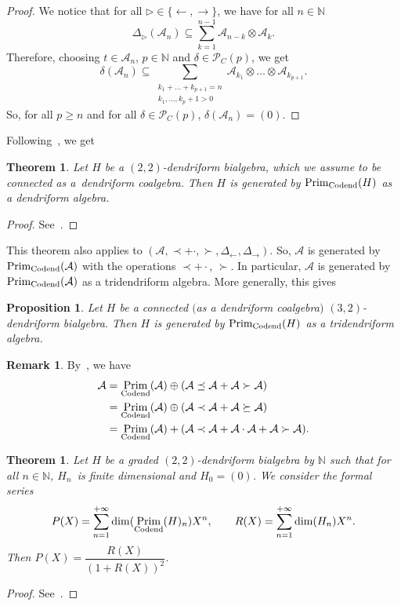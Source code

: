 \documentclass[10pt,a4paper]{amsart}
\numberwithin{equation}{section}
\theoremstyle{definition}
\newtheorem{Rq}[defi]{Remark}
\theoremstyle{plain}
\newtheorem{Prop}[defi]{Proposition}
\newtheorem{thm}[defi]{Theorem}
\newcommand{\N}{\mathbb{N}}
\DeclareMathOperator{\Prim}{Prim}
\begin{document}
\begin{proof}
	We notice that for all $\triangleright\in\{ \leftarrow,\rightarrow \}$, we have for all $n\in\N$
	\[
	\Delta_{\triangleright}(\mathcal{A}_n)\subseteq\sum_{k=1}^{n-1} \mathcal{A}_{n-k}\otimes \mathcal{A}_k.
	\]
	Therefore, choosing $t\in \mathcal{A}_n$, $p\in\N$ and $\delta\in\mathcal{P}_C(p)$, we get
	\[
	\delta(\mathcal{A}_n)\subseteq \sum_{\substack{k_1+\dots+k_{p+1}=n \\ k_1,\dots,k_{p}+1>0}} \mathcal{A}_{k_1}\otimes\dots\otimes \mathcal{A}_{k_{p+1}}.
	\]
	So, for all $p\geq n$ and for all $\delta\in\mathcal{P}_C(p)$, $\delta(\mathcal{A}_n)=(0).$
\end{proof}

Following~\cite{bidend}, we get

\begin{thm}
	Let $H$ be a $(2,2)$-dendriform bialgebra, which we assume to be connected as a~dendriform coalgebra. Then $H$ is generated by $\Prim_{\rm Codend}(H)$ as a dendriform algebra.
\end{thm}
\begin{proof}
	See~\cite[Theorem~21]{bidend}.
\end{proof}

This theorem also applies to $(\mathcal{A},\prec+\cdot, \succ,\Delta_{\leftarrow},\Delta_{\rightarrow})$.
So, $\mathcal{A}$ is generated by $\Prim_{\rm Codend}(\mathcal{A})$ with the operations $\prec+\cdot$, $\succ$.
In particular, $\mathcal{A}$ is generated by $\Prim_{\rm Codend}(\mathcal{A})$ as a tridendriform algebra. More generally, this gives

\begin{Prop}
	Let $H$ be a connected $($as a dendriform coalgebra$)$ $(3,2)$-dendriform bialgebra. Then $H$ is generated by $\Prim_{\rm Codend}(H)$ as a tridendriform algebra.
\end{Prop}
\begin{Rq}
	By~\cite{bidend}, we have
	\begin{align*}
		\mathcal{A}&=\Prim_{\rm Codend}(\mathcal{A})\oplus (\mathcal{A}\preceq \mathcal{A}+\mathcal{A}\succ\mathcal{A} ) \\
		&=\Prim_{\rm Codend}(\mathcal{A})\oplus (\mathcal{A}\prec \mathcal{A}+\mathcal{A}\succeq\mathcal{A} ) \\
		&=\Prim_{\rm Codend}(\mathcal{A})+ (\mathcal{A}\prec \mathcal{A}+\mathcal{A}\cdot \mathcal{A}+\mathcal{A}\succ\mathcal{A} ).
	\end{align*}
\end{Rq}
\begin{thm}	\label{thmcodend}
	Let $H$ be a graded $(2,2)$-dendriform bialgebra by $\N$ such that for all $n\in\N$, $H_n$~is finite dimensional and $H_0=(0)$. We consider the formal series
	\begin{gather*}
		P(X)=\sum_{n=1}^{+\infty}\dim(\Prim_{\rm Codend}(H)_n)X^n, \qquad R(X)=\sum_{n=1}^{+\infty}\dim(H_n)X^n.
	\end{gather*}
	Then $P(X)=\dfrac{R(X)}{(1+R(X))^2}$.
\end{thm}
\begin{proof}
	See~\cite[Corollary 37]{bidend}.
\end{proof}
\end{document}
